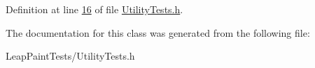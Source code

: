 Definition at line \hyperlink{_utility_tests_8h_source_l00016}{16} of file \hyperlink{_utility_tests_8h_source}{Utility\-Tests.\-h}.



The documentation for this class was generated from the following file\-:\begin{DoxyCompactItemize}
\item 
Leap\-Paint\-Tests/Utility\-Tests.\-h\end{DoxyCompactItemize}

